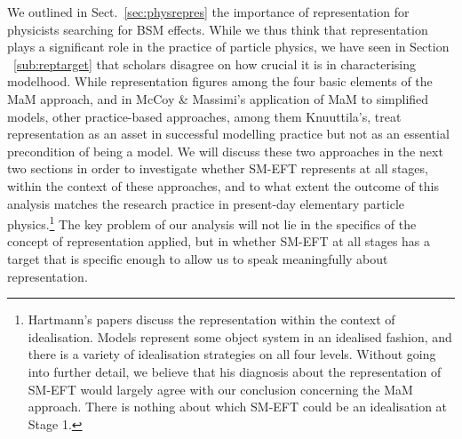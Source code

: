 We outlined in Sect.~\ref{sec:physrepres} the importance of representation for physicists searching for BSM effects. 
While we thus think that representation plays a significant role in the practice of particle physics, we have seen in Section ~\ref{sub:reptarget} that scholars disagree on how crucial it is in characterising modelhood. 
While representation figures among the four basic elements of the MaM approach, and in McCoy \& Massimi's application of MaM to simplified models, other practice-based approaches, among them Knuuttila's, treat representation as an asset in successful modelling practice but not as an essential precondition of being a model. 
We will discuss these two approaches in the next two sections in order to investigate whether SM-EFT represents at all stages, within the context of these approaches, and to what extent the outcome of this analysis matches the research practice in present-day elementary particle physics.\footnote{Hartmann's papers discuss the representation within the context of idealisation. Models represent some object system in an idealised fashion, and there is a variety of idealisation strategies on all four levels. Without going into further detail, we believe that his diagnosis about the representation of SM-EFT would largely agree with our conclusion concerning the MaM approach. There is nothing about which SM-EFT could be an idealisation at Stage 1.}
The key problem of our analysis will not lie in the specifics of the concept of representation applied, but in whether SM-EFT at all stages has a target that is specific enough to allow us to speak meaningfully about representation.


